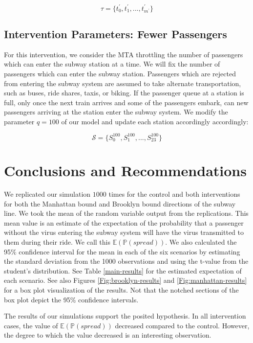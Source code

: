 \documentclass[12pt]{article}
\begin{document}
  \[ \tau = \{ t_0^{'}, t_1^{'}, ..., t_{m^{'}}^{'} \} \]

\subsection{Intervention Parameters: Fewer Passengers}

For this intervention, we consider the MTA throttling the number of passengers which can enter the subway station at a time. We will fix the number of passengers which can enter the subway station. Passengers which are rejected from entering the subway system are assumed to take alternate transportation, such as buses, ride shares, taxis, or biking. If the passenger queue at a station is full, only once the next train arrives and some of the passengers embark, can new passengers arriving at the station enter the subway system. We modify the parameter $q = 100$ of our model and update each station accordingly accordingly:

\[ \mathcal{S} = \{ S_0^{100}, S_1^{100}, ... , S_{23}^{100} \} \]


\section{Conclusions and Recommendations}
 
	We replicated our simulation $1000$ times for the control and both interventions for both the Manhattan bound and Brooklyn bound directions of the subway line. We took the mean of the random variable output from the replications. This mean value is an estimate of the expectation of the probability that a passenger without the virus entering the subway system will have the virus transmitted to them during their ride. We call this $\mathbb{E}(\mathbb{P}(spread))$. We also calculated the 95\% confidence interval for the mean in each of the six scenarios by estimating the standard deviation from the 1000 observations and using the t-value from the student's distribution. See Table \ref{main-results} for the estimated expectation of each scenario. See also Figures \ref{Fig:brooklyn-results} and \ref{Fig:manhattan-results} for a box plot visualization of the results. Not that the notched sections of the box plot depict the 95\% confidence intervals.

	The results of our simulations support the posited hypothesis. In all intervention cases, the value of $\mathbb{E}(\mathbb{P}(spread))$ decreased compared to the control. However, the degree to which the value decreased is an interesting observation. 
	
\end{document}
